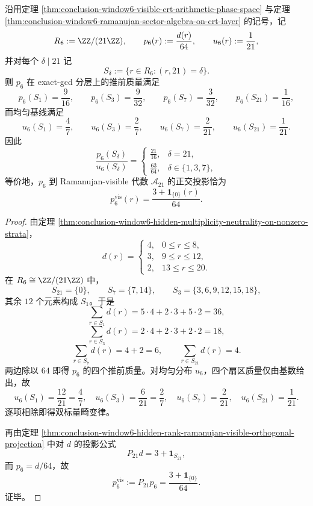 \begin{theorem}\label{thm:conclusion-window6-output-exact-gcd-two-scalar-distortion}
沿用定理 \ref{thm:conclusion-window6-visible-crt-arithmetic-phase-space} 与定理 \ref{thm:conclusion-window6-ramanujan-sector-algebra-on-crt-layer} 的记号，记
\[
R_6:=\ZZ/(21\ZZ),
\qquad
p_6(r):=\frac{d(r)}{64},
\qquad
u_6(r):=\frac1{21},
\]
并对每个 \(\delta\mid 21\) 记
\[
S_\delta:=\{r\in R_6:(r,21)=\delta\}.
\]
则 \(p_6\) 在 exact-gcd 分层上的推前质量满足
\[
p_6(S_1)=\frac{9}{16},\qquad
p_6(S_3)=\frac{9}{32},\qquad
p_6(S_7)=\frac{3}{32},\qquad
p_6(S_{21})=\frac{1}{16},
\]
而均匀基线满足
\[
u_6(S_1)=\frac{4}{7},\qquad
u_6(S_3)=\frac{2}{7},\qquad
u_6(S_7)=\frac{2}{21},\qquad
u_6(S_{21})=\frac{1}{21}.
\]
因此
\[
\boxed{\;
\frac{p_6(S_\delta)}{u_6(S_\delta)}
=
\begin{cases}
\frac{21}{16},& \delta=21,\\[4pt]
\frac{63}{64},& \delta\in\{1,3,7\},
\end{cases}\;}
\]
等价地，\(p_6\) 到 Ramanujan-visible 代数 \(\mathcal A_{21}\) 的正交投影恰为
\[
\boxed{\;
p_6^{\mathrm{vis}}(r)=\frac{3+\mathbf 1_{\{0\}}(r)}{64}.\;}
\]
\end{theorem}
\begin{proof}
由定理 \ref{thm:conclusion-window6-hidden-multiplicity-neutrality-on-nonzero-strata}，
\[
d(r)=
\begin{cases}
4,&0\le r\le 8,\\
3,&9\le r\le 12,\\
2,&13\le r\le 20.
\end{cases}
\]
在 \(R_6\cong \ZZ/(21\ZZ)\) 中，
\[
S_{21}=\{0\},\qquad
S_7=\{7,14\},\qquad
S_3=\{3,6,9,12,15,18\},
\]
其余 \(12\) 个元素构成 \(S_1\)。于是
\[
\sum_{r\in S_1}d(r)=5\cdot 4+2\cdot 3+5\cdot 2=36,
\]
\[
\sum_{r\in S_3}d(r)=2\cdot 4+2\cdot 3+2\cdot 2=18,
\]
\[
\sum_{r\in S_7}d(r)=4+2=6,
\qquad
\sum_{r\in S_{21}}d(r)=4.
\]
两边除以 \(64\) 即得 \(p_6\) 的四个推前质量。对均匀分布 \(u_6\)，四个扇区质量仅由基数给出，故
\[
u_6(S_1)=\frac{12}{21}=\frac47,\quad
u_6(S_3)=\frac{6}{21}=\frac27,\quad
u_6(S_7)=\frac{2}{21},\quad
u_6(S_{21})=\frac1{21}.
\]
逐项相除即得双标量畸变律。

再由定理 \ref{thm:conclusion-window6-hidden-rank-ramanujan-visible-orthogonal-projection} 中对 \(d\) 的投影公式
\[
P_{21}d=3+\mathbf 1_{S_{21}},
\]
而 \(p_6=d/64\)，故
\[
p_6^{\mathrm{vis}}:=P_{21}p_6=\frac{3+\mathbf 1_{\{0\}}}{64}.
\]
证毕。
\end{proof}

